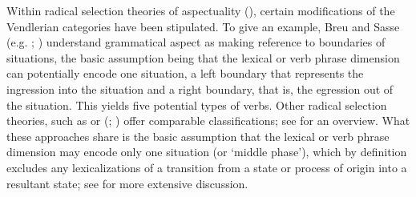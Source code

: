 Within radical selection theories of aspectuality (), certain modifications of the Vendlerian categories have been stipulated. To give an example, Breu and Sasse (e.g. \citealt{BreuW1984}; \citealt{SasseHJ1991}) understand grammatical aspect as making reference to boundaries of situations, the basic assumption being that the lexical or verb phrase dimension can potentially encode one situation, a left boundary that represents the ingression into the situation and a right boundary, that is, the egression out of the situation. This yields five potential types of verbs. Other radical selection theories, such as \citet{BickelB1997} or \citeauthor{JohansonL1996} (\citeyear{JohansonL1996}; \citeyear{JohansonL2000}) offer comparable classifications; see \citet[48–52]{CroftW2012} for an overview. What these approaches share is the basic assumption that the lexical or verb phrase dimension may encode only one situation (or \lq middle phase'), which by definition excludes any lexicalizations of a transition from a state or process of origin into a resultant state; see \citet{PersohnB2017b} for more extensive discussion.

